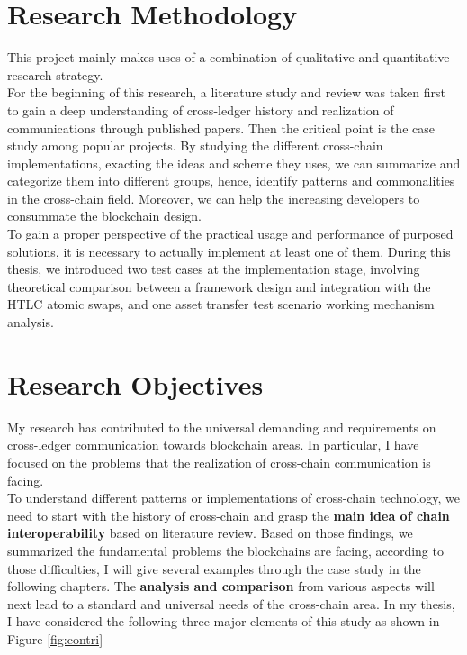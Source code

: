 \section{Research Methodology}
\label{sec:rm}
\noindent This project mainly makes uses of a combination of qualitative and quantitative research strategy.\\

\noindent For the beginning of this research, a literature study and review was taken first to gain a deep understanding of cross-ledger history and realization of communications through published papers. Then the critical point is the case study among popular projects. By studying the different cross-chain implementations, exacting the ideas and scheme they uses, we can summarize and categorize them into different groups, hence, identify patterns and commonalities in the cross-chain field. Moreover, we can help the increasing developers to consummate the blockchain design.\\

\noindent To gain a proper perspective of the practical usage and performance of purposed solutions, it is necessary to actually implement at least one of them.  During this thesis, we introduced two test cases at the implementation stage, involving theoretical comparison between a framework design and integration with the HTLC atomic swaps, and one asset transfer test scenario working mechanism analysis.  
         
\section{Research Objectives}
\label{sec:ro}
\noindent My research has contributed to the universal demanding and requirements on cross-ledger communication towards blockchain areas. In particular, I have focused on the problems that the realization of cross-chain communication is facing.\\

\noindent To understand different patterns or implementations of cross-chain technology, we need to start with the history of cross-chain and grasp the \textbf{main idea of chain interoperability} based on literature review. Based on those findings, we summarized the fundamental problems the blockchains are facing, according to those difficulties, I will give several examples through the case study in the following chapters.  The \textbf{analysis and comparison} from various aspects will next lead to a standard and universal needs of the cross-chain area. In my thesis, I have considered the following three major elements of this study as shown in Figure \ref{fig:contri}

